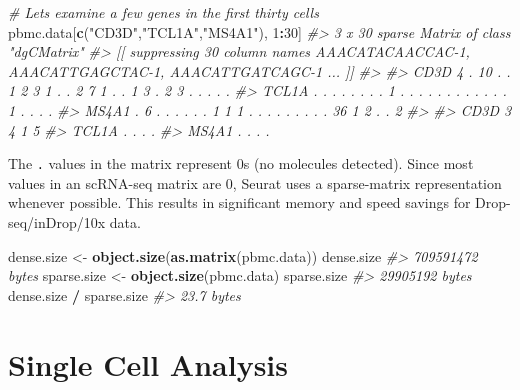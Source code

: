 \documentclass[
]{book}
\newenvironment{Shaded}{\begin{snugshade}}{\end{snugshade}}
\newcommand{\CommentTok}[1]{\textcolor[rgb]{0.56,0.35,0.01}{\textit{#1}}}
\newcommand{\DecValTok}[1]{\textcolor[rgb]{0.00,0.00,0.81}{#1}}
\newcommand{\FunctionTok}[1]{\textcolor[rgb]{0.13,0.29,0.53}{\textbf{#1}}}
\newcommand{\NormalTok}[1]{#1}
\newcommand{\OtherTok}[1]{\textcolor[rgb]{0.56,0.35,0.01}{#1}}
\newcommand{\SpecialCharTok}[1]{\textcolor[rgb]{0.81,0.36,0.00}{\textbf{#1}}}
\newcommand{\StringTok}[1]{\textcolor[rgb]{0.31,0.60,0.02}{#1}}
\begin{document}
\begin{Shaded}
\begin{Highlighting}[]
\CommentTok{\# Lets examine a few genes in the first thirty cells}
\NormalTok{pbmc.data[}\FunctionTok{c}\NormalTok{(}\StringTok{"CD3D"}\NormalTok{,}\StringTok{"TCL1A"}\NormalTok{,}\StringTok{"MS4A1"}\NormalTok{), }\DecValTok{1}\SpecialCharTok{:}\DecValTok{30}\NormalTok{]}
\CommentTok{\#\textgreater{} 3 x 30 sparse Matrix of class "dgCMatrix"}
\CommentTok{\#\textgreater{}   [[ suppressing 30 column names \textquotesingle{}AAACATACAACCAC{-}1\textquotesingle{}, \textquotesingle{}AAACATTGAGCTAC{-}1\textquotesingle{}, \textquotesingle{}AAACATTGATCAGC{-}1\textquotesingle{} ... ]]}
\CommentTok{\#\textgreater{}                                                            }
\CommentTok{\#\textgreater{} CD3D  4 . 10 . . 1 2 3 1 . . 2 7 1 . . 1 3 . 2  3 . . . . .}
\CommentTok{\#\textgreater{} TCL1A . .  . . . . . . 1 . . . . . . . . . . .  . 1 . . . .}
\CommentTok{\#\textgreater{} MS4A1 . 6  . . . . . . 1 1 1 . . . . . . . . . 36 1 2 . . 2}
\CommentTok{\#\textgreater{}              }
\CommentTok{\#\textgreater{} CD3D  3 4 1 5}
\CommentTok{\#\textgreater{} TCL1A . . . .}
\CommentTok{\#\textgreater{} MS4A1 . . . .}
\end{Highlighting}
\end{Shaded}

The \texttt{.} values in the matrix represent 0s (no molecules detected). Since most values in an scRNA-seq matrix are 0, Seurat uses a sparse-matrix representation whenever possible. This results in significant memory and speed savings for Drop-seq/inDrop/10x data.

\begin{Shaded}
\begin{Highlighting}[]
\NormalTok{dense.size }\OtherTok{\textless{}{-}} \FunctionTok{object.size}\NormalTok{(}\FunctionTok{as.matrix}\NormalTok{(pbmc.data))}
\NormalTok{dense.size}
\CommentTok{\#\textgreater{} 709591472 bytes}
\NormalTok{sparse.size }\OtherTok{\textless{}{-}} \FunctionTok{object.size}\NormalTok{(pbmc.data)}
\NormalTok{sparse.size}
\CommentTok{\#\textgreater{} 29905192 bytes}
\NormalTok{dense.size }\SpecialCharTok{/}\NormalTok{ sparse.size}
\CommentTok{\#\textgreater{} 23.7 bytes}
\end{Highlighting}
\end{Shaded}

\hypertarget{part-single-cell-analysis}{%
\part{Single Cell Analysis}\label{part-single-cell-analysis}}
\end{document}
